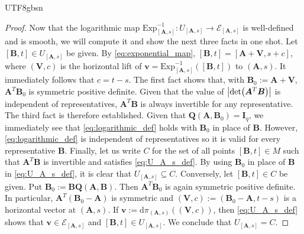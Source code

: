 \documentclass[12pt]{report}
\theoremstyle{plain}
\theoremstyle{definition}
\begin{document}
\begin{CJK*}{UTF8}{gbsn}
\begin{proof}
Now that the logarithmic map
$\text{Exp}^{-1}_{[\bm{A},s]}:U_{[\bm{A},s]} \to \mathcal{E}_{[\bm{A},s]}$
is well-defined and is smooth,
we will compute it and 
show the next three facts 
in one shot.
Let $[\bm{B},t] \in U_{[\bm{A},s]}$ be given.
By \eqref{eq:exponential_map},
$[\bm{B},t] = [\bm{A} + \bm{V},s+c]$,
where $(\bm{V}, c)$ is the horizontal lift of 
$\bm{v} = \text{Exp}^{-1}_{[\bm{A},s]}([\bm{B},t])$ to $(\bm{A}, s)$.
It immediately follows that $c = t - s$.
The first fact shows that, with $\bm{B}_0 := \bm{A} + \bm{V}$,
$\bm{A}^T\bm{B}_0$
is symmetric positive definite.
Given that the value 
of $\abs{\det(\bm{A}^T\bm{B})}$
is independent of representatives,
$\bm{A}^T\bm{B}$ is always invertible 
for any representative.
The third fact is therefore established.
Given that $\bm{Q}(\bm{A},\bm{B}_0) = \bm{I}_q$,
we immediately see that \eqref{eq:logarithmic_def} 
holds with $\bm{B}_0$ 
in place of $\bm{B}$.
However, \eqref{eq:logarithmic_def} is independent 
of representatives so it is valid for every representative $\bm{B}$.
Finally, 
let us write $C$ for the set of all points $[\bm{B},t] \in M$
such that $\bm{A}^T \bm{B}$ is invertible and
satisfies \eqref{eq:U_A_s_def}.
By using $\bm{B}_0$ 
in place of $\bm{B}$ in \eqref{eq:U_A_s_def},
it is clear that
$U_{[\bm{A},s]} \subseteq C$.
Conversely, let $[\bm{B},t] \in C$ be given.
Put $\bm{B}_0:=\bm{B}\bm{Q}(\bm{A}, \bm{B})$.
Then $\bm{A}^T\bm{B}_0$ is again symmetric 
positive definite.
In particular, $\bm{A}^T(\bm{B}_0-\bm{A})$
is symmetric and $(\bm{V}, c) := (\bm{B}_0-\bm{A}, t-s)$
is a horizontal vector at $(\bm{A},s)$.
If $\bm{v} := \mathrm{d} \pi_{(\bm{A},s)}((\bm{V}, c))$,
then \eqref{eq:U_A_s_def} shows that $\bm{v} \in \mathcal{E}_{[\bm{A},s]}$
and $[\bm{B},t] \in U_{[\bm{A},s]}$.
We conclude that $U_{[\bm{A},s]} = C$.


\end{proof}
\end{CJK*}
\end{document}
